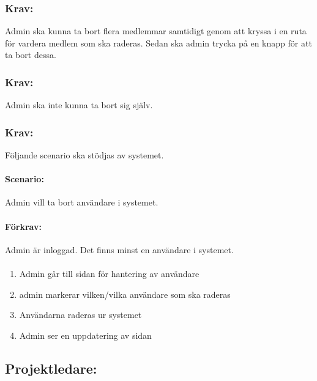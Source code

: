 \documentclass[paper=a4, fontsize=11pt,twoside]{article}
\begin{document}
	\subsubsection{Krav:} Admin ska kunna ta bort flera medlemmar samtidigt genom att kryssa i en ruta för vardera medlem som ska raderas. Sedan ska admin trycka på en knapp för att ta bort dessa.
	\subsubsection{Krav:} Admin ska inte kunna ta bort sig själv.
	
	\subsubsection{Krav:} Följande scenario ska stödjas av systemet. 
	\paragraph{Scenario:}
	Admin vill ta bort användare i systemet.
	\paragraph{Förkrav:}
	Admin är inloggad. Det finns minst en användare i systemet.
	\paragraph{}
	\begin{enumerate}
		\item Admin går till sidan för hantering av användare
		\item admin markerar vilken/vilka användare som ska raderas
		\item Användarna raderas ur systemet
		\item Admin ser en uppdatering av sidan
	\end{enumerate}
	
\newpage
\subsection{Projektledare:}
\paragraph{}
\end{document}
